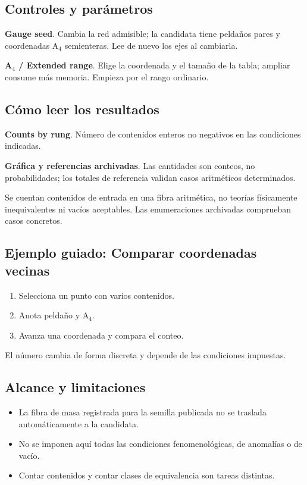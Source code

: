 \documentclass[11pt,a4paper]{article}
\begin{document}
\subsection*{Controles y parámetros}
\textbf{Gauge seed}. Cambia la red admisible; la candidata tiene peldaños pares y coordenadas A\ensuremath{{}_{4}} semienteras. Lee de nuevo los ejes al cambiarla.

\textbf{A\ensuremath{{}_{4}} / Extended range}. Elige la coordenada y el tamaño de la tabla; ampliar consume más memoria. Empieza por el rango ordinario.

\subsection*{Cómo leer los resultados}
\textbf{Counts by rung}. Número de contenidos enteros no negativos en las condiciones indicadas.

\textbf{Gráfica y referencias archivadas}. Las cantidades son conteos, no probabilidades; los totales de referencia validan casos aritméticos determinados.

Se cuentan contenidos de entrada en una fibra aritmética, no teorías físicamente inequivalentes ni vacíos aceptables. Las enumeraciones archivadas comprueban casos concretos.
\subsection*{Ejemplo guiado: Comparar coordenadas vecinas}
\begin{enumerate}
\item Selecciona un punto con varios contenidos.
\item Anota peldaño y A\ensuremath{{}_{4}}.
\item Avanza una coordenada y compara el conteo.
\end{enumerate}
El número cambia de forma discreta y depende de las condiciones impuestas.
\subsection*{Alcance y limitaciones}
\begin{itemize}
\item La fibra de masa registrada para la semilla publicada no se traslada automáticamente a la candidata.
\item No se imponen aquí todas las condiciones fenomenológicas, de anomalías o de vacío.
\item Contar contenidos y contar clases de equivalencia son tareas distintas.
\end{itemize}
\end{document}
